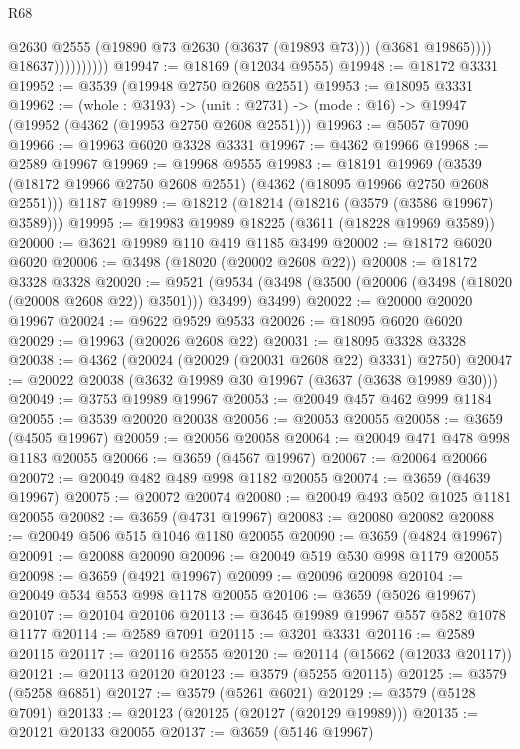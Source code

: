 \begin{lexlean}{R68}
\begin{coremodule}
                              @2630
                              @2555
                              (@19890 @73 @2630 (@3637 (@19893 @73)))
                              (@3681 @19865))))
                        @18637))))))))))
@19947 := @18169 (@12034 @9555)
@19948 := @18172 @3331
@19952 := @3539 (@19948 @2750 @2608 @2551)
@19953 := @18095 @3331
@19962 := (whole : @3193) ->
  (unit : @2731) -> (mode : @16) -> @19947 (@19952 (@4362 (@19953 @2750 @2608 @2551)))
@19963 := @5057 @7090
@19966 := @19963 @6020 @3328 @3331
@19967 := @4362 @19966
@19968 := @2589 @19967
@19969 := @19968 @9555
@19983 := @18191
    @19969
    (@3539 (@18172 @19966 @2750 @2608 @2551) (@4362 (@18095 @19966 @2750 @2608 @2551)))
    @1187
@19989 := @18212 (@18214 (@18216 (@3579 (@3586 @19967) @3589)))
@19995 := @19983 @19989 @18225 (@3611 (@18228 @19969 @3589))
@20000 := @3621 @19989 @110 @419 @1185 @3499
@20002 := @18172 @6020 @6020
@20006 := @3498 (@18020 (@20002 @2608 @22))
@20008 := @18172 @3328 @3328
@20020 := @9521
    (@9534 (@3498 (@3500 (@20006 (@3498 (@18020 (@20008 @2608 @22)) @3501))) @3499) @3499)
@20022 := @20000 @20020 @19967
@20024 := @9622 @9529 @9533
@20026 := @18095 @6020 @6020
@20029 := @19963 (@20026 @2608 @22)
@20031 := @18095 @3328 @3328
@20038 := @4362 (@20024 (@20029 (@20031 @2608 @22) @3331) @2750)
@20047 := @20022 @20038 (@3632 @19989 @30 @19967 (@3637 (@3638 @19989 @30)))
@20049 := @3753 @19989 @19967
@20053 := @20049 @457 @462 @999 @1184
@20055 := @3539 @20020 @20038
@20056 := @20053 @20055
@20058 := @3659 (@4505 @19967)
@20059 := @20056 @20058
@20064 := @20049 @471 @478 @998 @1183 @20055
@20066 := @3659 (@4567 @19967)
@20067 := @20064 @20066
@20072 := @20049 @482 @489 @998 @1182 @20055
@20074 := @3659 (@4639 @19967)
@20075 := @20072 @20074
@20080 := @20049 @493 @502 @1025 @1181 @20055
@20082 := @3659 (@4731 @19967)
@20083 := @20080 @20082
@20088 := @20049 @506 @515 @1046 @1180 @20055
@20090 := @3659 (@4824 @19967)
@20091 := @20088 @20090
@20096 := @20049 @519 @530 @998 @1179 @20055
@20098 := @3659 (@4921 @19967)
@20099 := @20096 @20098
@20104 := @20049 @534 @553 @998 @1178 @20055
@20106 := @3659 (@5026 @19967)
@20107 := @20104 @20106
@20113 := @3645 @19989 @19967 @557 @582 @1078 @1177
@20114 := @2589 @7091
@20115 := @3201 @3331
@20116 := @2589 @20115
@20117 := @20116 @2555
@20120 := @20114 (@15662 (@12033 @20117))
@20121 := @20113 @20120
@20123 := @3579 (@5255 @20115)
@20125 := @3579 (@5258 @6851)
@20127 := @3579 (@5261 @6021)
@20129 := @3579 (@5128 @7091)
@20133 := @20123 (@20125 (@20127 (@20129 @19989)))
@20135 := @20121 @20133 @20055
@20137 := @3659 (@5146 @19967)

\end{coremodule}
\end{lexlean}
